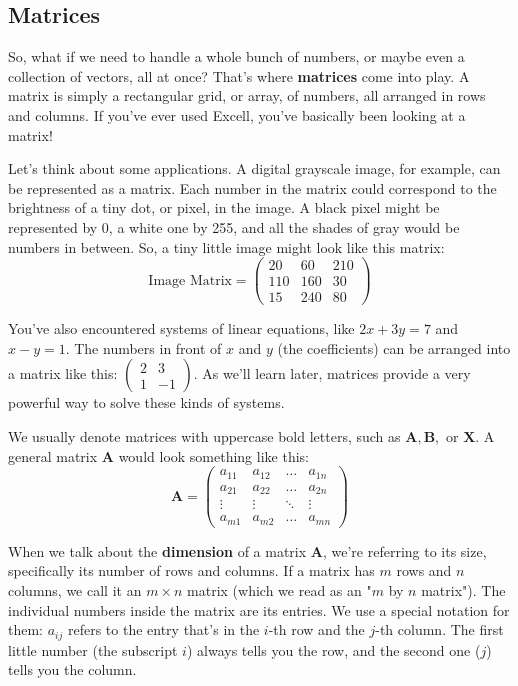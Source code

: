 \documentclass[11pt]{article}
\begin{document}
\subsection{Matrices}

So, what if we need to handle a whole bunch of numbers, or maybe even a collection of vectors, all at once? That's where \textbf{matrices} come into play. A matrix is simply a rectangular grid, or array, of numbers, all arranged in rows and columns. If you've ever used Excell, you've basically been looking at a matrix!

Let's think about some applications. A digital grayscale image, for example, can be represented as a matrix. Each number in the matrix could correspond to the brightness of a tiny dot, or pixel, in the image. A black pixel might be represented by 0, a white one by 255, and all the shades of gray would be numbers in between. So, a tiny little image might look like this matrix:
\[ \text{Image Matrix} = \begin{pmatrix} 20 & 60 & 210 \\ 110 & 160 & 30 \\ 15 & 240 & 80 \end{pmatrix} \]

You've also encountered systems of linear equations, like $2x + 3y = 7$ and $x - y = 1$. The numbers in front of $x$ and $y$ (the coefficients) can be arranged into a matrix like this: $\begin{pmatrix} 2 & 3 \\ 1 & -1 \end{pmatrix}$. As we'll learn later, matrices provide a very powerful way to solve these kinds of systems.

We usually denote matrices with uppercase bold letters, such as $\mathbf{A}, \mathbf{B},$ or $\mathbf{X}$. A general matrix $\mathbf{A}$ would look something like this:
\[ \mathbf{A} = \begin{pmatrix}
a_{11} & a_{12} & \dots & a_{1n} \\
a_{21} & a_{22} & \dots & a_{2n} \\
\vdots & \vdots & \ddots & \vdots \\
a_{m1} & a_{m2} & \dots & a_{mn}
\end{pmatrix} \]

When we talk about the \textbf{dimension} of a matrix $\mathbf{A}$, we're referring to its size, specifically its number of rows and columns. If a matrix has $m$ rows and $n$ columns, we call it an $m \times n$ matrix (which we read as an "$m$ by $n$ matrix"). The individual numbers inside the matrix are its entries. We use a special notation for them: $a_{ij}$ refers to the entry that's in the $i$-th row and the $j$-th column. The first little number (the subscript $i$) always tells you the row, and the second one ($j$) tells you the column.
\end{document}

